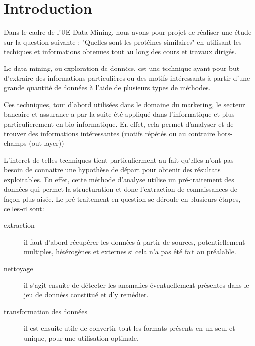 \section*{Introduction}

Dans le cadre de l'UE Data Mining, nous avons pour projet de réaliser une étude sur la question suivante : "Quelles sont les protéines similaires" en utilisant les techiques et informations obtenues tout au long des cours et travaux dirigés.

Le data mining, ou exploration de données, est une technique ayant pour but d'extraire des informations particulières ou des motifs intéressants à partir d'une grande quantité de données à l'aide de plusieurs types de méthodes.

Ces techniques, tout d'abord utilisées dans le domaine du marketing, le secteur bancaire et assurance a par la suite été appliqué dans l'informatique et plus particulierement en bio-informatique. En effet, cela permet d'analyser et de trouver des informations intéressantes (motifs répétés ou au contraire hors-champs (out-layer))

L'interet de telles techniques tient particulierment au fait qu'elles n'ont pas besoin de connaitre une hypothèse de départ pour obtenir des résultats exploitables. En effet, cette méthode d'analyse utilise un pré-traitement des données qui permet la structuration et donc l'extraction de connaissances de façon plus aisée. Le pré-traitement en question se déroule en plusieurs étapes, celles-ci sont:
\begin{description}
\item[extraction]il faut d'abord récupérer les données à partir de sources, potentiellement multiples, hétérogènes et externes si cela n'a pas été fait au préalable.
\item[nettoyage]il s'agit ensuite de détecter les anomalies éventuellement présentes dans le jeu de données constitué et d'y remédier.
\item[transformation des données] il est ensuite utile de convertir tout les formats présents en un seul et unique, pour une utilisation optimale.
\end{description}

